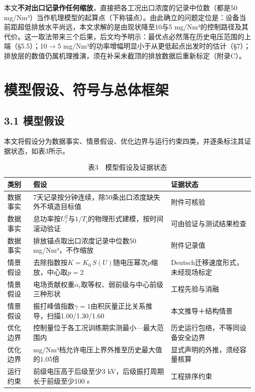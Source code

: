 \documentclass[UTF8,zihao=5,a4paper]{ctexart}
\begin{document}
本文\textbf{不对出口记录作任何缩放}，直接把各工况出口浓度的记录中位数（都是50 mg/Nm³）当作机理模型的起算点（下称锚点）。由此确立的问题定位是：设备当前距超低排放水平尚远，本文求解的是由现状降至10与5 mg/Nm³的控制路径及其代价。这一取法带来三个后果，后文均予明示：最优点必然落在历史电压范围的上端（§5.5）；10$\rightarrow$5 mg/Nm³的功率增幅明显小于从更低起点出发时的估计（§7）；排放层的数值仍属机理推演，须在补采未截顶的排放数据后重新标定（附录C）。

\section{模型假设、符号与总体框架}

\subsection*{3.1 模型假设}

本文将假设分为数据事实、情景假设、优化边界与运行约束四类，并逐条标注其证据状态，如表3所示。


\begin{table}[htbp]
\centering
\caption*{\normalsize 表3　模型假设及证据状态}
\vspace{-2pt}
\begin{tabularx}{\textwidth}{l>{\hsize=1.127\hsize\raggedright\arraybackslash}X>{\hsize=0.873\hsize\raggedright\arraybackslash}X}
\toprule
类别 & 假设 & 证据状态 \\
\midrule
数据事实 & 7天记录按分钟连续，除50条出口浓度缺失外不填造目标值 & 附件可核验 \\
数据事实 & 总功率按$U_i^2$与$1/T_i$的物理形式建模，按时间滚动验证 & 可由验证与测试结果检查 \\
数据事实 & 排放锚点取出口浓度记录中位数50 mg/Nm³，不作缩放 & 附件记录值 \\
情景假设 & 去除指数按$K=K_0\,S(U)$随电压幂次$p$缩放，中心取$p=2$ & Deutsch迁移速度形式，未经现场标定 \\
情景假设 & 电场贡献权重$\alpha_i$取等权、弱前级与中心前级三种形状 & 工程先验与消融 \\
情景假设 & 振打峰值指数$\gamma=1$由积灰量正比关系推导，扫描1.00/1.30/1.60 & 本文推导＋结构情景 \\
优化边界 & 控制量位于各工况训练期实测最小—最大范围内 & 历史运行包络，不等同设备安全边界 \\
优化边界 & 5 mg/Nm³档允许电压上界外推至历史最大值的1.05倍 & 显式声明的外推，须经容量核算 \\
运行约束 & 前级电压高于后级至少3 kV，后级振打周期长于前级至少100 s & 工程排序约束 \\
\bottomrule
\end{tabularx}
\end{table}
\end{document}
